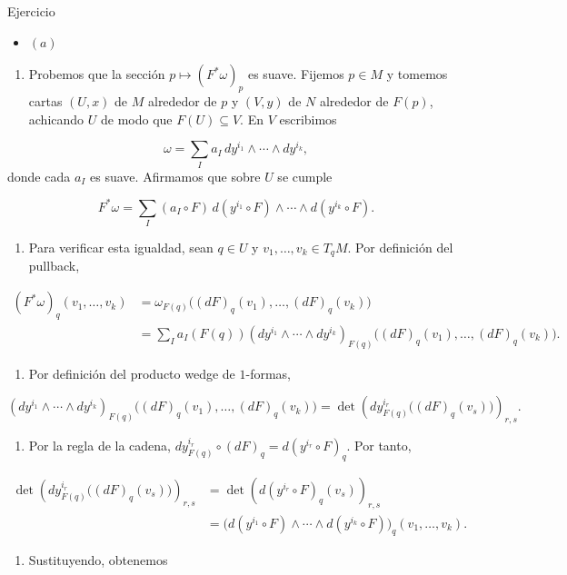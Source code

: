 \begin{bookproof}{Ejercicio}
\begin{itemize}
\item $(a)$
\end{itemize}
\begin{enumerate}
\item Probemos que la sección $p\mapsto(F^*\omega)_p$ es suave. Fijemos $p\in M$ y tomemos cartas $(U,x)$ de $M$ alrededor de $p$ y $(V,y)$ de $N$ alrededor de $F(p)$, achicando $U$ de modo que $F(U)\subseteq V$. En $V$ escribimos
\end{enumerate}
\[
\omega=\sum_I a_I\,dy^{i_1}\wedge\cdots\wedge dy^{i_k},
\]
donde cada $a_I$ es suave. Afirmamos que sobre $U$ se cumple

\[
F^*\omega=\sum_I(a_I\circ F)\,d(y^{i_1}\circ F)\wedge\cdots\wedge d(y^{i_k}\circ F).
\]
\begin{enumerate}[start=2]
\item Para verificar esta igualdad, sean $q\in U$ y $v_1,\ldots,v_k\in T_qM$. Por definición del pullback,
\end{enumerate}
\[
\begin{aligned}(F^*\omega)_q(v_1,\ldots,v_k)&=\omega_{F(q)}\bigl((dF)_q(v_1),\ldots,(dF)_q(v_k)\bigr)\\&=\sum_I a_I(F(q))(dy^{i_1}\wedge\cdots\wedge dy^{i_k})_{F(q)}\bigl((dF)_q(v_1),\ldots,(dF)_q(v_k)\bigr).\end{aligned}
\]
\begin{enumerate}[start=3]
\item Por definición del producto wedge de $1$-formas,
\end{enumerate}
\[
(dy^{i_1}\wedge\cdots\wedge dy^{i_k})_{F(q)}\bigl((dF)_q(v_1),\ldots,(dF)_q(v_k)\bigr)=\det\left(dy^{i_r}_{F(q)}\bigl((dF)_q(v_s)\bigr)\right)_{r,s}.
\]
\begin{enumerate}[start=4]
\item Por la regla de la cadena, $dy^{i_r}_{F(q)}\circ(dF)_q=d(y^{i_r}\circ F)_q$. Por tanto,
\end{enumerate}
\[
\begin{aligned}\det\left(dy^{i_r}_{F(q)}\bigl((dF)_q(v_s)\bigr)\right)_{r,s}&=\det\left(d(y^{i_r}\circ F)_q(v_s)\right)_{r,s}\\&=\bigl(d(y^{i_1}\circ F)\wedge\cdots\wedge d(y^{i_k}\circ F)\bigr)_q(v_1,\ldots,v_k).\end{aligned}
\]
\begin{enumerate}[start=5]
\item Sustituyendo, obtenemos

\end{enumerate}
\end{bookproof}
